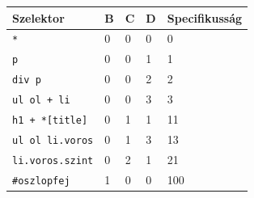 \begin{frame}
  \begin{center}
    \begin{tabular}{lllll}
    Szelektor & B & C & D & Specifikusság \\ \hline
    \texttt{*} & 0 & 0 & 0 & 0\\
    \texttt{p} & 0 & 0 & 1 & 1\\
    \texttt{div p} & 0 & 0 & 2 & 2\\
    \texttt{ul ol + li} & 0 & 0 & 3 & 3\\
    \texttt{h1 + *[title]} & 0 & 1 & 1 & 11\\
    \texttt{ul ol li.voros} & 0 & 1 & 3 & 13\\
    \texttt{li.voros.szint} & 0 & 2 & 1 & 21\\
    \texttt{\#oszlopfej} & 1 & 0 & 0 & 100
    \end{tabular}
  \end{center}
\end{frame}
